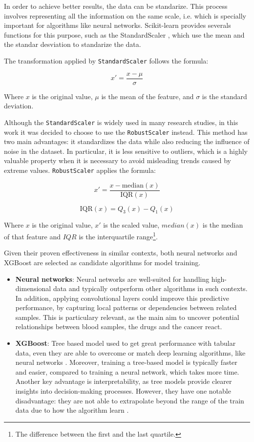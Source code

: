 In order to achieve better results, the data can be standarize. This process involves representing all the information on the same scale, i.e. which is specially important for algorithms like neural networks. Scikit-learn provides severals functions for this purpose, such as the StandardScaler \cite{scikit-learn-standardscaler}, which use the mean and the standar desviation to standarize the data.

The transformation applied by \texttt{StandardScaler} follows the formula:

\[
x' = \frac{x - \mu}{\sigma}
\]

Where \( x \) is the original value, \( \mu \) is the mean of the feature, and \( \sigma \) is the standard deviation.

Although the \texttt{StandardScaler} is widely used in many research studies, in this work it was decided to choose to use the \texttt{RobustScaler} \cite{scikit-learn-robustscaler} instead. This method has two main advantages: it standardizes the data while also reducing the influence of noise in the dataset. In particular, it is less sensitive to outliers, which is a highly valuable property when it is necessary to avoid misleading trends caused by extreme values. \texttt{RobustScaler} applies the formula:

\[
x' = \frac{x - \text{median}(x)}{\text{IQR}(x)}
\]

\[
\text{IQR}(x) = Q_3(x) - Q_1(x)
\]

Where \(x\) is the original value, \(x'\) is the scaled value, \(median(x)\) is the median of that feature and \(IQR\) is the interquartile range\footnote{The difference between the first and the last quartile.}. 

Given their proven effectiveness in similar contexts, both neural networks and XGBoost are selected as candidate algorithms for model training.
\begin{itemize}
    \item \textbf{Neural networks}: Neural networks are well-suited for handling high-dimensional data and typically outperform other algorithms in such contexts. In addition, applying convolutional layers could improve this predictive performance, by capturing local patterns or dependencies between related samples. This is particulary relevant, as the main aim to uncover potential relationships between blood samples, the drugs and the cancer react.
    \item \textbf{XGBoost}: Tree based model used to get great performance with tabular data, even they are able to overcome or match deep learning algorithms, like neural networks \cite{treesOverNets}. Moreover, training a tree-based model is typically faster and easier, compared to training a neural network, which takes more time. Another key advantage is interpretability, as tree models provide clearer insights into decision-making processes. However, they have one notable disadvantage: they are not able to extrapolate beyond the range of the train data due to how the algorithm learn \cite{treesLimitations}.
\end{itemize}

